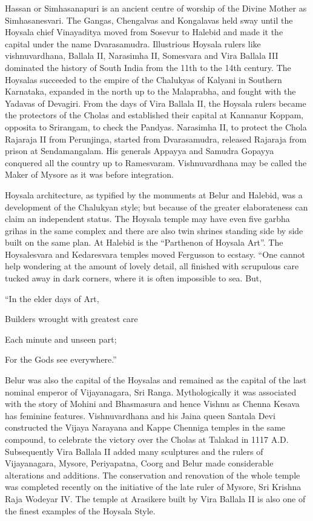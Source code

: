 \documentclass{book}
\begin{document}
Hassan or Simhasanapuri is an ancient centre of worship of the Divine
Mother as Simhasanesvari. The Gangas, Chengalvas and Kongalavas held
sway until the Hoysala chief Vinayaditya moved from Sosevur to Halebid
and made it the capital under the name Dvarasamudra. Illustrious
Hoysala rulers like vishnuvardhana, Ballala II, Narasimha II,
Somesvara and Vira Ballala III dominated the history of South India
from the 11th to the 14th century. The Hoysalas succeeded to the
empire of the Chalukyas of Kalyani in Southern Karnataka, expanded in
the north up to the Malaprabha, and fought with the Yadavas of
Devagiri. From the days of Vira Ballala II, the Hoysala rulers became
the protectors of the Cholas and established their capital at Kannanur
Koppam, opposita to Srirangam, to check the Pandyas. Narasimha II, to
protect the Chola Rajaraja II from Perunjinga, started from
Dvarasamudra, released Rajaraja from prison at Sendamangalam. His
generals Appayya and Samudra Gopayya conquered all the country up to
Ramesvaram.  Vishnuvardhana may be called the Maker of Mysore as it
was before integration.

Hoysala architecture, as typified by the monuments at Belur and
Halebid, was a development of the Chalukyan style; but because of the
greater elaborateness can claim an independent status. The Hoysala
temple may have even five garbha grihas in the same complex and there
are also twin shrines standing side by side built on the same plan. At
Halebid is the ``Parthenon of Hoysala Art''. The Hoysalesvara and
Kedaresvara temples moved Fergusson to ecstasy. ``One cannot help
wondering at the amount of lovely detail, all finished with scrupulous
care tucked away in dark corners, where it is often impossible to sea. But,

``In the elder days of Art,

Builders wrought with greatest care

Each minute and unseen part;

For the Gods see everywhere.''


Belur was also the capital of the Hoysalas and remained as the capital
of the last nominal emperor of Vijayanagara, Sri Ranga. Mythologically
it was associated with the story of Mohini and Bhasmasura and hence
Vishnu as Chenna Kesava has feminine features. Vishnuvardhana and his
Jaina queen Santala Devi constructed the Vijaya Narayana and Kappe
Chenniga temples in the same compound, to celebrate the victory over
the Cholas at Talakad in 1117 A.D. Subsequently Vira Ballala II added
many sculptures and the rulers of Vijayanagara, Mysore, Periyapatna,
Coorg and Belur made considerable alterations and additions. The
conservation and renovation of the whole temple was completed recently
on the initiative of the late ruler of Mysore, Sri Krishna Raja
Wodeyar IV. The temple at Arasikere built by Vira Ballala II is also
one of the finest examples of the Hoysala Style.
\end{document}
